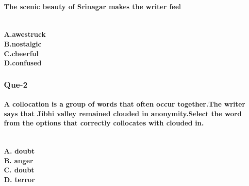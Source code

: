 \documentclass[12pt]{article}
\begin{document}
\paragraph{The scenic beauty of Srinagar makes the writer feel}
\\
 \textbf{A.awestruck}\\
 \textbf{B.nostalgic}\\
 \textbf{C.cheerful}\\
 \textbf{D.confused}\\
 
 
 
\subsubsection{Que-2}
\paragraph{A collocation is a group of words that often occur together.The writer says that Jibhi valley remained clouded in anonymity.Select the word from the options that correctly collocates with clouded in.}\\
\textbf{A. doubt}\\
\textbf{B. anger}\\
\textbf{C. doubt}\\
\textbf{D. terror}\\

\newpage
{}
\end{document}
